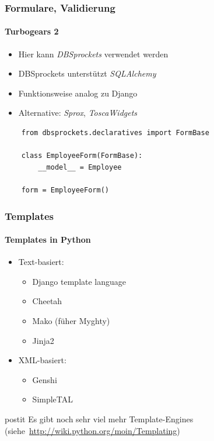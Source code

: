 \documentclass[
    t,
    smaller,
    compress,
    xcolor=svgnames,            %
    table,
]{beamer}
\newenvironment{beamerpostit}[1]%
{\begin{beamercolorbox}[wd=\textwidth,sep=2pt,rounded=true,shadow=true]{postit} #1}%
{\end{beamercolorbox}}%
\begin{document}
\begin{frame}[fragile]
  \frametitle{Formulare, Validierung}
  \framesubtitle{Turbogears 2}

  \begin{itemize}[<1->]
     \item Hier kann \textit{DBSprockets} verwendet werden
     \item DBSprockets unterstützt \textit{SQLAlchemy}
     \item Funktionsweise analog zu Django
     \item Alternative: \textit{Sprox}, \textit{ToscaWidgets}
  \end{itemize}
  \begin{lstlisting}
    from dbsprockets.declaratives import FormBase

    class EmployeeForm(FormBase):
        __model__ = Employee

    form = EmployeeForm()
  \end{lstlisting}
\end{frame}


\begin{frame}
  \frametitle{Templates}
  \framesubtitle{Templates in Python}

  \begin{itemize}[<1->]
    \item Text-basiert:
        \begin{itemize}[<1->]
            \item Django template language
            \item Cheetah
            \item Mako (füher Myghty)
            \item Jinja2
        \end{itemize}
    \item XML-basiert:
        \begin{itemize}[<1->]
            \item Genshi
            \item SimpleTAL
        \end{itemize}
  \end{itemize}

  \vspace{12pt}
  \begin{beamerpostit}
    Es gibt noch sehr viel mehr Template-Engines
    (siehe~\url{http://wiki.python.org/moin/Templating})
  \end{beamerpostit}

\end{frame}
\end{document}
